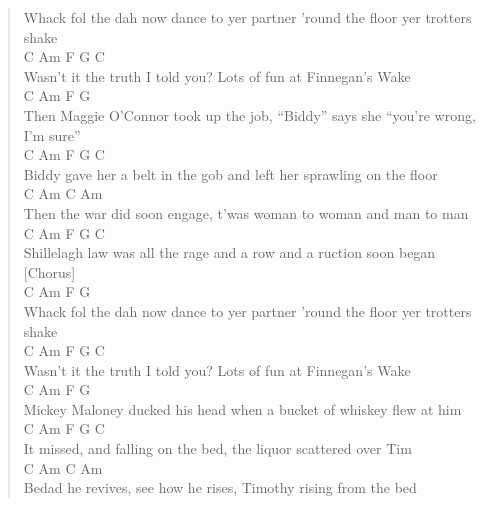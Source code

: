 \documentclass[11pt]{article}
\begin{document}
\begin{verse}
Whack fol the dah now dance to yer partner 'round the floor yer trotters shake\\
C             Am                F              G          C\\
Wasn't it the truth I told you? Lots of fun at Finnegan's Wake\\
\vspace*{1em}
\hspace*{6em}C                   Am          F                        G\\
Then Maggie O'Connor took up the job, ``Biddy'' says she ``you're wrong, I'm sure''\\
C                Am                  F                  G      C\\
Biddy gave her a belt in the gob and left her sprawling on the floor\\
C                Am                 C                  Am\\
Then the war did soon engage, t'was woman to woman and man to man\\
\hspace*{4em}C              Am                 F                 G      C\\
Shillelagh law was all the rage and a row and a ruction soon began\\
\vspace*{1em}
[Chorus]\\
C                     Am                    F                   G\\
Whack fol the dah now dance to yer partner 'round the floor yer trotters shake\\
C             Am                F              G          C\\
Wasn't it the truth I told you? Lots of fun at Finnegan's Wake\\
\vspace*{1em}
C              Am                     F                 G\\
Mickey Maloney ducked his head when a bucket of whiskey flew at him\\
\hspace*{3em}C                   Am              F                G    C\\
It missed, and falling on the bed, the liquor scattered over Tim\\
\hspace*{3em}C                  Am            C              Am\\
Bedad he revives, see how he rises, Timothy rising from the bed\\

\end{verse}
\end{document}
